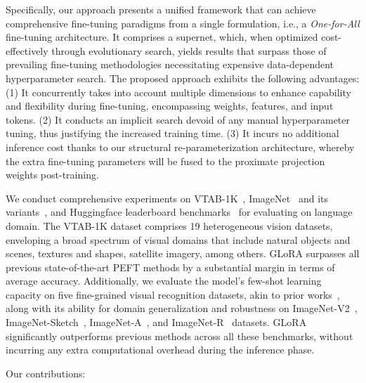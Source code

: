 Specifically, our approach presents a unified framework that can achieve comprehensive fine-tuning paradigms from a single formulation, i.e., a {\em One-for-All} fine-tuning architecture. It comprises a supernet, which, when optimized cost-effectively through evolutionary search, yields results that surpass those of prevailing fine-tuning methodologies necessitating expensive data-dependent hyperparameter search. The proposed approach exhibits the following advantages: ({1}) It concurrently takes into account multiple dimensions to enhance capability and flexibility during fine-tuning, encompassing weights, features, and input tokens. ({2})  It conducts an implicit search devoid of any manual hyperparameter tuning, thus justifying the increased training time. ({3})  It incurs no additional inference cost thanks to our structural re-parameterization architecture, whereby the extra fine-tuning parameters will be fused to the proximate projection weights post-training.

We conduct comprehensive experiments on VTAB-1K~\citep{zhai2020the}, ImageNet~\citep{5206848} and its variants~\citep{recht2019imagenet,wang2019learning,hendrycks2021natural,hendrycks2021many}, and Huggingface leaderboard benchmarks~\citep{open-llm-leaderboard} for evaluating on language domain. The VTAB-1K dataset comprises 19 heterogeneous vision datasets, enveloping a broad spectrum of visual domains that include natural objects and scenes, textures and shapes, satellite imagery, among others. GLoRA surpasses all previous state-of-the-art PEFT methods by a substantial margin in terms of average accuracy. Additionally, we evaluate the model's few-shot learning capacity on five fine-grained visual recognition datasets, akin to prior works~\citep{zhang2022neural,jia2022visual}, along with its ability for domain generalization and robustness on ImageNet-V2~\citep{recht2019imagenet}, ImageNet-Sketch~\citep{wang2019learning}, ImageNet-A~\citep{hendrycks2021natural}, and ImageNet-R~\citep{hendrycks2021many} datasets. GLoRA significantly outperforms previous methods across all these benchmarks, without incurring any extra computational overhead during the inference phase. 

Our contributions:

